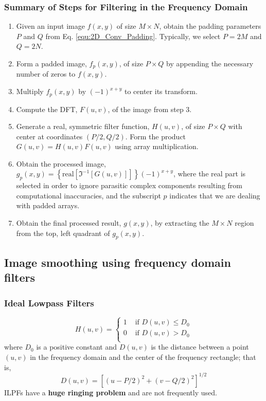 \subsubsection{Summary of Steps for Filtering in the Frequency Domain }
  
\begin{enumerate}
	\item Given an input image $f(x,y)$ of size $M \times N$, obtain the padding parameters $P$ and $Q$ from Eq. \ref{equ:2D_Conv_Padding}. Typically, we select $P=2M$ and $Q=2N$.
	\item Form a padded image, $f_p(x,y)$, of size $P \times Q$ by appending the necessary number of zeros to $f(x,y)$.
	\item Multiply $f_p(x,y)$ by $(-1)^{x+y}$ to center its transform.
	\item Compute the DFT, $F(u,v)$, of the image from step 3.
	\item Generate a real, symmetric filter function, $H(u,v)$, of size $P \times Q$ with center at coordinates $(P/2,Q/2)$. Form the product $G(u,v) = H(u,v) F(u,v)$ using array multiplication.
	\item Obtain the processed image, $g_p(x,y) = \left\lbrace \text{real} \left[ \Im^{-1} \left[ G(u,v) \right] \right] \right\rbrace (-1)^{x+y}$, where the real part is selected in order to ignore parasitic complex components resulting from computational inaccuracies, and the subscript $p$ indicates that we are dealing with padded arrays.
	\item Obtain the final processed result, $g(x,y)$, by extracting the $M \times N$ region from the top, left quadrant of $g_p(x,y)$.
\end{enumerate}

\subsection{Image smoothing using frequency domain filters }
\subsubsection{Ideal Lowpass Filters}
\begin{equation}
	H(u,v)  = 
		\begin{cases}
			1 & \text{  if } D(u,v) \leq D_0 \\
			0 & \text{  if } D(u,v) > D_0 \\ 
		\end{cases}
\end{equation}
where $D_0$ is a positive constant and $D(u,v)$ is the distance between a point $(u,v)$ in the frequency domain and the center of the frequency rectangle; that is,
\begin{equation}
	D(u,v) = \left[ (u-P/2)^2 + (v-Q/2)^2 \right]^{1/2}
	\label{equ:Freq_Filter_D_uv}
\end{equation}
ILPFs have a \textbf{huge ringing problem} and are not frequently used.

